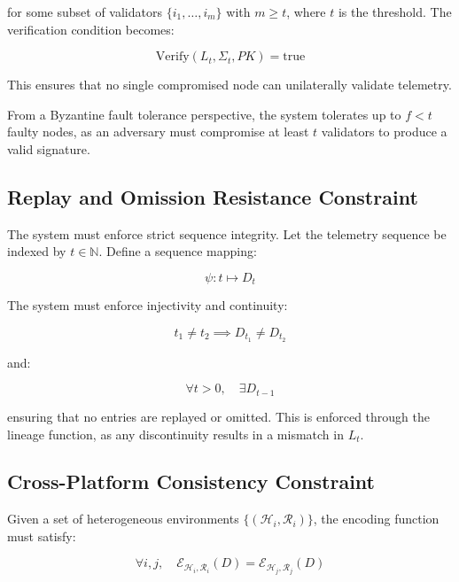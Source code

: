 for some subset of validators $\{i_1, \dots, i_m\}$ with $m \geq t$, where $t$ is the threshold. The verification condition becomes:

\begin{equation}
\text{Verify}(L_t, \Sigma_t, PK) = \text{true}
\end{equation}

This ensures that no single compromised node can unilaterally validate telemetry.

From a Byzantine fault tolerance perspective, the system tolerates up to $f < t$ faulty nodes, as an adversary must compromise at least $t$ validators to produce a valid signature.

\subsection{Replay and Omission Resistance Constraint}

The system must enforce strict sequence integrity. Let the telemetry sequence be indexed by $t \in \mathbb{N}$. Define a sequence mapping:

\begin{equation}
\psi: t \mapsto D_t
\end{equation}

The system must enforce injectivity and continuity:

\begin{equation}
t_1 \neq t_2 \implies D_{t_1} \neq D_{t_2}
\end{equation}

and:

\begin{equation}
\forall t > 0, \quad \exists D_{t-1}
\end{equation}

ensuring that no entries are replayed or omitted. This is enforced through the lineage function, as any discontinuity results in a mismatch in $L_t$.

\subsection{Cross-Platform Consistency Constraint}

Given a set of heterogeneous environments $\{(\mathcal{H}_i, \mathcal{R}_i)\}$, the encoding function must satisfy:

\begin{equation}
\forall i,j, \quad \mathcal{E}_{\mathcal{H}_i, \mathcal{R}_i}(D) = \mathcal{E}_{\mathcal{H}_j, \mathcal{R}_j}(D)
\end{equation}

